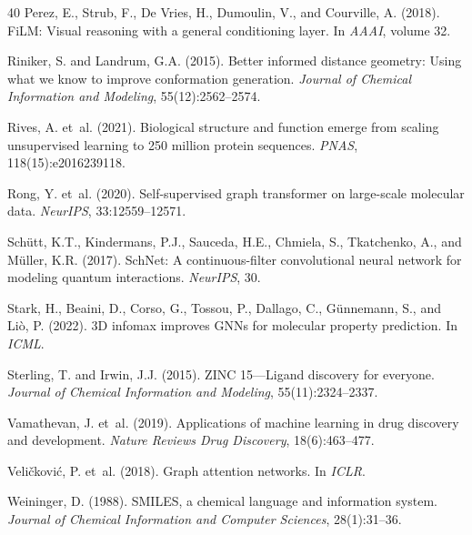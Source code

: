 \documentclass[11pt]{article}
\begin{document}
\begin{thebibliography}{40}
Perez, E., Strub, F., De Vries, H., Dumoulin, V., and Courville, A. (2018).
\newblock FiLM: Visual reasoning with a general conditioning layer.
\newblock In \emph{AAAI}, volume 32.

Riniker, S. and Landrum, G.A. (2015).
\newblock Better informed distance geometry: Using what we know to improve conformation generation.
\newblock \emph{Journal of Chemical Information and Modeling}, 55(12):2562--2574.

Rives, A. et~al. (2021).
\newblock Biological structure and function emerge from scaling unsupervised learning to 250 million protein sequences.
\newblock \emph{PNAS}, 118(15):e2016239118.

Rong, Y. et~al. (2020).
\newblock Self-supervised graph transformer on large-scale molecular data.
\newblock \emph{NeurIPS}, 33:12559--12571.

Sch{\"u}tt, K.T., Kindermans, P.J., Sauceda, H.E., Chmiela, S., Tkatchenko, A., and M{\"u}ller, K.R. (2017).
\newblock SchNet: A continuous-filter convolutional neural network for modeling quantum interactions.
\newblock \emph{NeurIPS}, 30.

Stark, H., Beaini, D., Corso, G., Tossou, P., Dallago, C., G{\"u}nnemann, S., and Li{\`o}, P. (2022).
\newblock 3D infomax improves GNNs for molecular property prediction.
\newblock In \emph{ICML}.

Sterling, T. and Irwin, J.J. (2015).
\newblock ZINC 15---Ligand discovery for everyone.
\newblock \emph{Journal of Chemical Information and Modeling}, 55(11):2324--2337.

Vamathevan, J. et~al. (2019).
\newblock Applications of machine learning in drug discovery and development.
\newblock \emph{Nature Reviews Drug Discovery}, 18(6):463--477.

Veli{\v{c}}kovi{\'c}, P. et~al. (2018).
\newblock Graph attention networks.
\newblock In \emph{ICLR}.

Weininger, D. (1988).
\newblock SMILES, a chemical language and information system.
\newblock \emph{Journal of Chemical Information and Computer Sciences}, 28(1):31--36.


\end{thebibliography}
\end{document}
